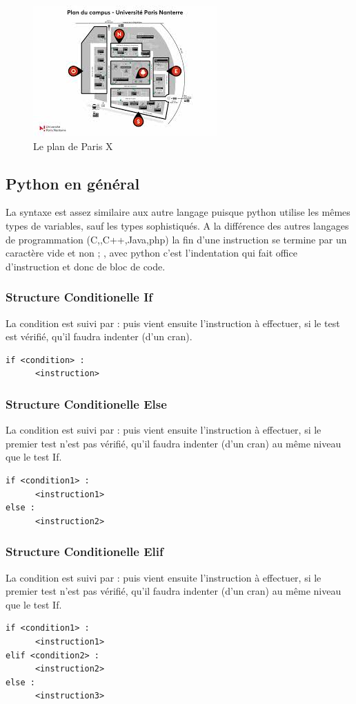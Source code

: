 \documentclass[a4paper, 12pt, twoside]{article}
\begin{document}
\begin{center}
\begin{figure}[h!]
\centering
\includegraphics[scale=1.3]{plan.jpeg}
\caption{Le plan de Paris X}
\end{figure}
\end{center}
\subsection{Python en général}
La syntaxe est assez similaire aux autre langage puisque python utilise les mêmes types de variables, sauf les types sophistiqués. A la différence des autres langages de programmation (C,,C++,Java,php) la fin d'une instruction se termine par un caractère vide
et non  ; , avec python c'est l'indentation qui fait office d'instruction et donc de bloc de code.
\subsubsection{ Structure Conditionelle If }
La condition est suivi par  :  puis vient ensuite l'instruction à effectuer, si le test est vérifié, qu'il faudra indenter (d'un cran).
\begin{verbatim}
if <condition> :
      <instruction>
\end{verbatim}
\subsubsection{ Structure Conditionelle Else}
La condition est suivi par  :  puis vient ensuite l'instruction à effectuer, si le premier test n'est pas vérifié, qu'il faudra indenter (d'un cran) au même niveau que le test If.
\begin{verbatim}
if <condition1> :
      <instruction1>
else :
      <instruction2>
\end{verbatim}
\subsubsection{ Structure Conditionelle Elif }
La condition est suivi par  :  puis vient ensuite l'instruction à effectuer, si le premier test n'est pas vérifié, qu'il faudra indenter (d'un cran) au même niveau que le test If.
\begin{verbatim}
if <condition1> :
      <instruction1>
elif <condition2> :
      <instruction2>
else : 
      <instruction3>
\end{verbatim}
\end{document}
